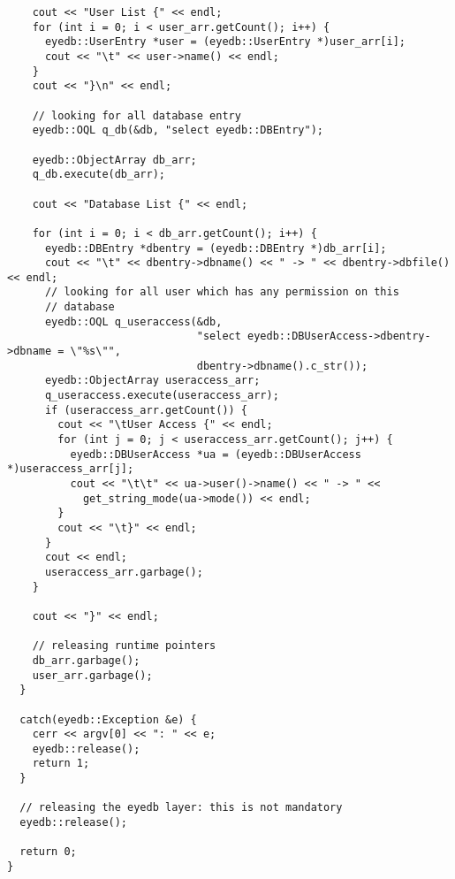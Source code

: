\begin{verbatim}
    cout << "User List {" << endl;
    for (int i = 0; i < user_arr.getCount(); i++) {
      eyedb::UserEntry *user = (eyedb::UserEntry *)user_arr[i];
      cout << "\t" << user->name() << endl;
    }
    cout << "}\n" << endl;

    // looking for all database entry
    eyedb::OQL q_db(&db, "select eyedb::DBEntry");

    eyedb::ObjectArray db_arr;
    q_db.execute(db_arr);

    cout << "Database List {" << endl;

    for (int i = 0; i < db_arr.getCount(); i++) {
      eyedb::DBEntry *dbentry = (eyedb::DBEntry *)db_arr[i];
      cout << "\t" << dbentry->dbname() << " -> " << dbentry->dbfile() << endl;
      // looking for all user which has any permission on this
      // database
      eyedb::OQL q_useraccess(&db,
                              "select eyedb::DBUserAccess->dbentry->dbname = \"%s\"",
                              dbentry->dbname().c_str());
      eyedb::ObjectArray useraccess_arr;
      q_useraccess.execute(useraccess_arr);
      if (useraccess_arr.getCount()) {
        cout << "\tUser Access {" << endl;
        for (int j = 0; j < useraccess_arr.getCount(); j++) {
          eyedb::DBUserAccess *ua = (eyedb::DBUserAccess *)useraccess_arr[j];
          cout << "\t\t" << ua->user()->name() << " -> " <<
            get_string_mode(ua->mode()) << endl;
        }
        cout << "\t}" << endl;
      }
      cout << endl;
      useraccess_arr.garbage();
    }

    cout << "}" << endl;

    // releasing runtime pointers
    db_arr.garbage();
    user_arr.garbage();
  }

  catch(eyedb::Exception &e) {
    cerr << argv[0] << ": " << e;
    eyedb::release();
    return 1;
  }

  // releasing the eyedb layer: this is not mandatory
  eyedb::release();

  return 0;
}
\end{verbatim}
\normalsize



